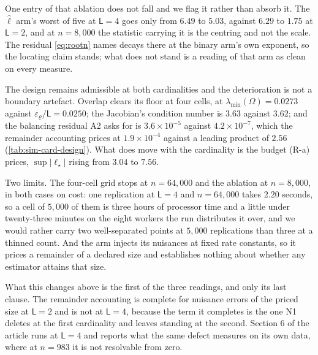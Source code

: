 \documentclass[
  12pt]{article}
\newcommand{\1}[1]{\mathds{1}\left[#1\right]}
\theoremstyle{plain}
\theoremstyle{definition}
\theoremstyle{definition}
\theoremstyle{remark}
\begin{document}
One entry of that ablation does not fall and we flag it rather than absorb it.
The $\hat\ell$ arm's worst of five at $\mathsf L=4$ goes only from $6.49$ to
$5.03$, against $6.29$ to $1.75$ at $\mathsf L=2$, and at $n=8{,}000$ the
statistic carrying it is the centring and not the scale. The residual
\eqref{eq:rootn} names decays there at the binary arm's own exponent, so the
locating claim stands; what does not stand is a reading of that arm as clean on
every measure.

The design remains admissible at both cardinalities and the deterioration is not
a boundary artefact. Overlap clears its floor at four cells, at
$\lambda_{\min}(\Omega)=0.0273$ against $\varepsilon_\varrho/\mathsf L=0.0250$;
the Jacobian's condition number is $3.63$ against $3.62$; and the balancing
residual A2 asks for is $3.6\times10^{-5}$ against $4.2\times10^{-7}$, which the
remainder accounting prices at $1.9\times10^{-4}$ against a leading product of
$2.56$ (\cref{tab:sim-card-design}). What does move with the cardinality is the
budget (R-a) prices, $\sup|\ell_\star|$ rising from $3.04$ to $7.56$.

Two limits. The four-cell grid stops at $n=64{,}000$ and the ablation at
$n=8{,}000$, in both cases on cost: one replication at $\mathsf L=4$ and
$n=64{,}000$ takes $2.20$ seconds, so a cell of $5{,}000$ of them is three hours
of processor time and a little under twenty-three minutes on the eight workers
the run distributes it over, and we would rather carry two well-separated points at
$5{,}000$ replications than three at a thinned count. And the arm injects its nuisances at fixed rate
constants, so it prices a remainder of a declared size and establishes nothing
about whether any estimator attains that size.

What this changes above is the first of the three readings, and only its last
clause. The remainder accounting is complete for nuisance errors of the priced
size at $\mathsf L=2$ and is not at $\mathsf L=4$, because the term it completes
is the one N1 deletes at the first cardinality and leaves standing at the second.
Section 6 of the article runs at $\mathsf L=4$ and reports
what the same defect measures on its own data, where at $n=983$ it is not
resolvable from zero.
\end{document}
